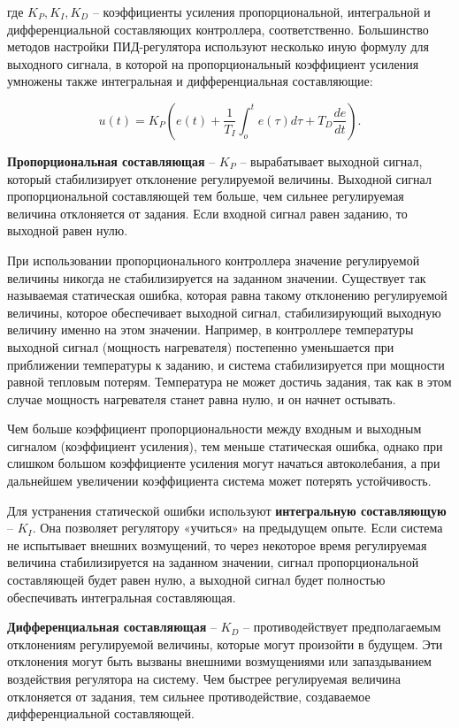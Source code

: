где $K_P, K_I, K_D$ – коэффициенты усиления пропорциональной, интегральной и дифференциальной составляющих контроллера, соответственно.
Большинство методов настройки ПИД-регулятора используют несколько иную формулу для выходного сигнала, в которой на пропорциональный коэффициент усиления умножены также интегральная и дифференциальная составляющие:

\begin{equation}
    u(t) = K_P \left( e(t) + \frac{1}{T_I} \int_{o}^{t} e(\tau) d \tau +T_D \frac{de}{dt}\right).
\end{equation}

\textbf{Пропорциональная составляющая} – $K_P$ – вырабатывает выходной сигнал, который стабилизирует отклонение регулируемой величины. Выходной сигнал пропорциональной составляющей тем больше, чем сильнее регулируемая величина отклоняется от задания. Если входной сигнал равен заданию, то выходной равен нулю.

При использовании пропорционального контроллера значение регулируемой величины никогда не стабилизируется на заданном значении. Существует так называемая статическая ошибка, которая равна такому отклонению регулируемой величины, которое обеспечивает выходной сигнал, стабилизирующий выходную величину именно на этом значении. Например, в контроллере температуры выходной сигнал (мощность нагревателя) постепенно уменьшается при приближении температуры к заданию, и система стабилизируется при мощности равной тепловым потерям. Температура не может достичь задания, так как в этом случае мощность нагревателя станет равна нулю, и он начнет остывать.

Чем больше коэффициент пропорциональности между входным и выходным сигналом (коэффициент усиления), тем меньше статическая ошибка, однако при слишком большом коэффициенте усиления могут начаться автоколебания, а при дальнейшем увеличении коэффициента система может потерять устойчивость.

Для устранения статической ошибки используют \textbf{интегральную составляющую} – $K_I$. Она позволяет регулятору «учиться» на предыдущем опыте. Если система не испытывает внешних возмущений, то через некоторое время регулируемая величина стабилизируется на заданном значении, сигнал пропорциональной составляющей будет равен нулю, а выходной сигнал будет полностью обеспечивать интегральная составляющая.

\textbf{Дифференциальная составляющая} – $K_D$ – противодействует предполагаемым отклонениям регулируемой величины, которые могут произойти в будущем. Эти отклонения могут быть вызваны внешними возмущениями или запаздыванием воздействия регулятора на систему. Чем быстрее регулируемая величина отклоняется от задания, тем сильнее противодействие, создаваемое дифференциальной составляющей.

